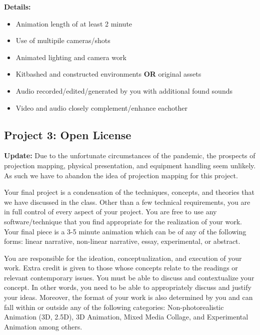 \textbf{Details:}
\begin{itemize}
	\tightlist
	\item Animation length of at least 2 minute
	\item Use of multipile cameras/shots
	\item Animated lighting and camera work
	\item Kitbashed and constructed environments \textbf{OR} original assets
	\item Audio recorded/edited/generated by you with additional found sounds
	\item Video and audio closely complement/enhance eachother
\end{itemize}

\hypertarget{project3}{\subsection{Project 3: Open License}}

\textbf{Update:} Due to the unfortunate circumstances of the pandemic, the prospects of projection mapping, physical presentation, and equipment handling seem unlikely. As such we have to abandon the idea of projection mapping for this project.

Your final project is a condensation of the techniques, concepts, and theories that we have discussed in the class. Other than a few technical requirements, you are in full control of every aspect of your project. You are free to use any software/technique that you find appropriate for the realization of your work. Your final piece is a 3-5 minute animation which can be of any of the following forms: linear narrative, non-linear narrative, essay, experimental, or abstract.

You are responsible for the ideation, conceptualization, and execution of your work. Extra credit is given to those whose concepts relate to the readings or relevant contemporary issues. You must be able to discuss and contextualize your concept. In other words, you need to be able to appropriately discuss and justify your ideas. Moreover, the format of your work is also determined by you and can fall within or outside any of the following categories:
Non-photorealistic Animation (3D, 2.5D), 3D Animation, Mixed Media Collage, and Experimental Animation among others.

